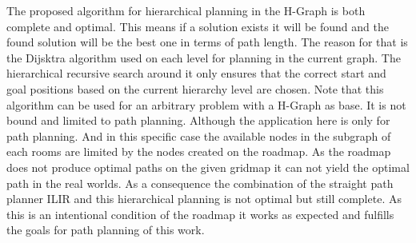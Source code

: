 The proposed algorithm for hierarchical planning in the H-Graph is both complete and optimal. This means if a solution exists it will be found and the found solution will be the best one in terms of path length. The reason for that is the Dijsktra algorithm used on each level for planning in the current graph. The hierarchical recursive search around it only ensures that the correct start and goal positions based on the current hierarchy level are chosen. Note that this algorithm can be used for an arbitrary problem with a H-Graph as base. It is not bound and limited to path planning. Although the application here is only for path planning. And in this specific case the available nodes in the subgraph of each rooms are limited by the nodes created on the roadmap. As the roadmap does not produce optimal paths on the given gridmap it can not yield the optimal path in the real worlds. As a consequence the combination of the straight path planner ILIR and this hierarchical planning is not optimal but still complete. As this is an intentional condition of the roadmap it works as expected and fulfills the goals for path planning of this work.





